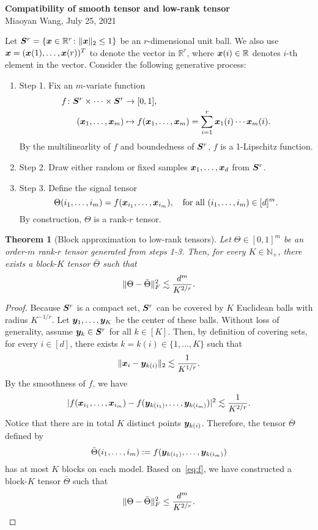 \documentclass[11pt]{article}
\theoremstyle{plain}
\newtheorem{thm}{Theorem}[section]
\theoremstyle{definition}
\begin{document}
\begin{center}
{\bf \Large Compatibility of smooth tensor and low-rank tensor}\\
Miaoyan Wang, July 25, 2021\\
\end{center}

Let $\bm S^r=\{\bm x\in\mathbb{R}^r\colon \lVert\bm x\rVert_2\leq 1\}$ be an $r$-dimensional unit ball. We also use $\bm x=(\bm x(1),\ldots,\bm x(r))^T$ to denote the vector in $\mathbb{R}^r$, where $\bm x(i)\in\mathbb{R}$ denotes $i$-th element in the vector. Consider the following generative process: 
\begin{enumerate}[wide]
\item[] Step 1. Fix an $m$-variate function
\begin{align}
f\colon \bm S^{r}\times\cdots\times \bm S^{r} &\to [0,1],\\
(\bm x_1,\ldots,\bm x_m)&\mapsto f(\bm x_1,\ldots,\bm x_m)=\sum_{i=1}^r\bm x_1(i)\cdots\bm x_m(i).
\end{align}
By the multilinearlity of $f$ and boundedness of $\bm S^r$, $f$ is a 1-Lipschitz function. 
\item[] Step 2. Draw either random or fixed samples $\bm x_1,\ldots,\bm x_d$ from $\bm S^r$. 
\item[] Step 3. Define the signal tensor 
\[
\Theta(i_1,\ldots,i_m)=f(\bm x_{i_1},\ldots,\bm x_{i_m}), \quad \text{for all }(i_1,\ldots,i_m)\in[d]^m.
\]
By construction, $\Theta$ is a rank-$r$ tensor. 
\end{enumerate}

\begin{thm}[Block approximation to low-rank tensors] Let $\Theta\in[0,1]^m$ be an order-$m$ rank-$r$ tensor generated from steps 1-3. Then, for every $K\in\mathbb{N}_{+}$, there exists a block-$K$ tensor $\bar \Theta$ such that
\[
\lVert\Theta-\bar \Theta\rVert_F^2 \lesssim {d^m\over K^{2/r}}. 
\]
\end{thm}
\begin{proof}
Because $\bm S^r$ is a compact set, $\bm S^r$ can be covered by $K$ Euclidean balls with radius $K^{-1/r}$. Let $\bm{y}_1,\ldots,\bm{y}_{K}$ be the center of these balls. Without loss of generality, assume $\bm{y}_k\in\bm S^r$ for all $k\in[K]$. Then, by definition of covering sets, for every $i\in[d]$, there exists $k=k(i)\in\{1,\ldots,K\}$ such that
\[
\lVert\bm x_i-\bm{y}_{k(i)}\rVert_2\lesssim {1\over K^{1/r}}. 
\]
By the smoothness of $f$, we have
\begin{equation}\label{eq:f}
|f(\bm x_{i_1},\ldots,\bm x_{i_m})-f(\bm{y}_{k(i_1)},\ldots,\bm{y}_{k(i_m)})|^2 \lesssim {1\over K^{2/r}}.
\end{equation}
Notice that there are in total $K$ distinct points $\bm{y}_{k(i)}$. Therefore, the tensor $\bar \Theta$ defined by
\[
\bar \Theta(i_1,\ldots,i_m):=f(\bm{y}_{k(i_1)},\ldots,\bm{y}_{k(i_m)})
\]
has at most $K$ blocks on each model. Based on~\eqref{eq:f}, we have constructed a block-$K$ tensor $\bar \Theta$ such that
\[
\lVert\Theta-\bar \Theta\rVert_F^2 \leq {d^m\over K^{2/r}}. 
\]
\end{proof}
\end{document}
